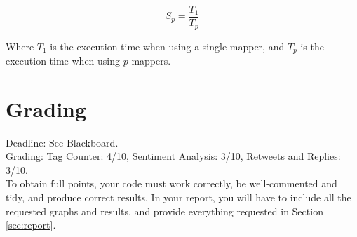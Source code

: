 \documentclass[a4paper,10pt]{article}
\begin{document}
  \[
  S_p = \frac{T_1}{T_p}
  \]
  
  Where $T_1$ is the execution time when using a single mapper, and $T_p$ is the execution time when using $p$ mappers.
  
  \section{Grading}
  Deadline: See Blackboard. \\
  Grading: Tag Counter: 4/10, Sentiment Analysis: 3/10, Retweets and Replies: 3/10.  \\
  To obtain full points, your code must work correctly, be well-commented and tidy, and produce correct results. In your report, you will have to include all the requested graphs and results, and provide everything requested in Section \ref{sec:report}.
\end{document}
